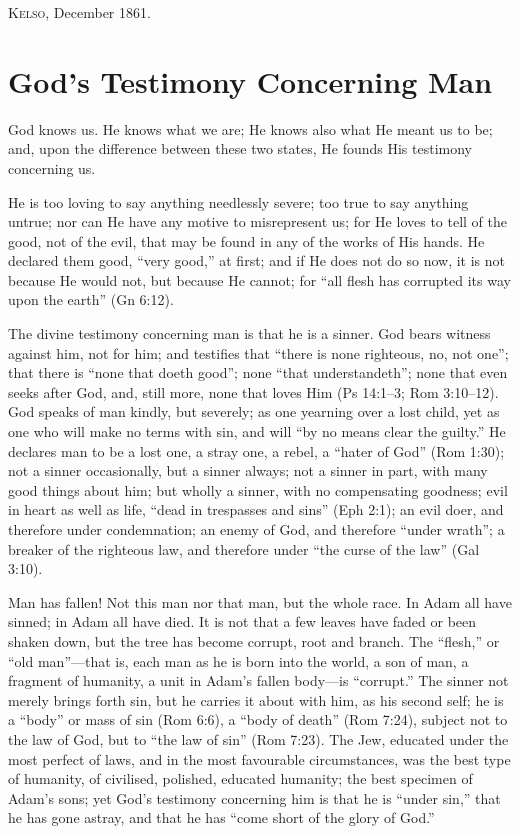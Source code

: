 \documentclass[
]{book}
\begin{document}
\textsc{Kelso}, December 1861.

\hypertarget{gods-testimony-concerning-man}{%
\chapter{God's Testimony Concerning Man}\label{gods-testimony-concerning-man}}

God knows us. He knows what we are; He knows also what He meant us to be; and, upon the difference between these two states, He founds His testimony concerning us.

He is too loving to say anything needlessly severe; too true to say anything untrue; nor can He have any motive to misrepresent us; for He loves to tell of the good, not of the evil, that may be found in any of the works of His hands. He declared them good, ``very good,'' at first; and if He does not do so now, it is not because He would not, but because He cannot; for ``all flesh has corrupted its way upon the earth'' (Gn 6:12).

The divine testimony concerning man is that he is a sinner. God bears witness against him, not for him; and testifies that ``there is none righteous, no, not one''; that there is ``none that doeth good''; none ``that understandeth''; none that even seeks after God, and, still more, none that loves Him (Ps 14:1--3; Rom 3:10--12). God speaks of man kindly, but severely; as one yearning over a lost child, yet as one who will make no terms with sin, and will ``by no means clear the guilty.'' He declares man to be a lost one, a stray one, a rebel, a ``hater of God'' (Rom 1:30); not a sinner occasionally, but a sinner always; not a sinner in part, with many good things about him; but wholly a sinner, with no compensating goodness; evil in heart as well as life, ``dead in trespasses and sins'' (Eph 2:1); an evil doer, and therefore under condemnation; an enemy of God, and therefore ``under wrath''; a breaker of the righteous law, and therefore under ``the curse of the law'' (Gal 3:10).

Man has fallen! Not this man nor that man, but the whole race. In Adam all have sinned; in Adam all have died. It is not that a few leaves have faded or been shaken down, but the tree has become corrupt, root and branch. The ``flesh,'' or ``old man''---that is, each man as he is born into the world, a son of man, a fragment of humanity, a unit in Adam's fallen body---is ``corrupt.'' The sinner not merely brings forth sin, but he carries it about with him, as his second self; he is a ``body'' or mass of sin (Rom 6:6), a ``body of death'' (Rom 7:24), subject not to the law of God, but to ``the law of sin'' (Rom 7:23). The Jew, educated under the most perfect of laws, and in the most favourable circumstances, was the best type of humanity, of civilised, polished, educated humanity; the best specimen of Adam's sons; yet God's testimony concerning him is that he is ``under sin,'' that he has gone astray, and that he has ``come short of the glory of God.''
\end{document}
